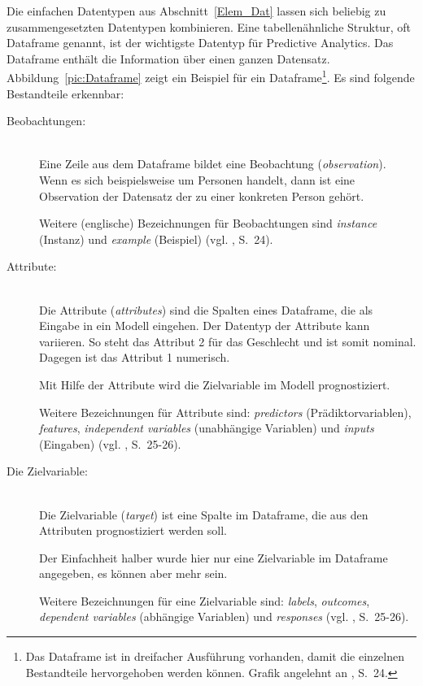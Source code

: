Die einfachen Datentypen aus Abschnitt~\ref{Elem_Dat} lassen sich beliebig zu
zusammengesetzten Datentypen kombinieren. Eine tabellenähnliche Struktur, oft
Dataframe genannt, ist der wichtigste Datentyp für Predictive Analytics. Das
Dataframe enthält die Information über einen ganzen Datensatz. Abbildung~\ref{pic:Dataframe}
zeigt ein Beispiel für ein Dataframe\footnote{
Das Dataframe ist in dreifacher Ausführung vorhanden, damit die einzelnen Bestandteile hervorgehoben werden können.
Grafik angelehnt an \cite{Bowles}, S.~24.
}. Es sind folgende Bestandteile erkennbar:

\begin{description}

\item[Beobachtungen:] \hfill \\
Eine Zeile aus dem Dataframe bildet eine Beobachtung (\emph{observation}).
Wenn es sich beispielsweise um Personen handelt, dann ist eine Observation der Datensatz der zu
einer konkreten Person gehört.

Weitere (englische) Bezeichnungen für Beobachtungen sind \emph{instance} (Instanz) und \emph{example} (Beispiel) (vgl. \cite{Bowles}, S.~24).

\item[Attribute:] \hfill \\
Die Attribute (\emph{attributes}) sind die Spalten eines Dataframe, die als Eingabe in ein Modell eingehen.
Der Datentyp der Attribute kann variieren. So steht das Attribut 2 für das Geschlecht und ist somit nominal.
Dagegen ist das Attribut 1 numerisch. 

Mit Hilfe der Attribute wird die Zielvariable im Modell prognostiziert.

Weitere Bezeichnungen für Attribute sind:
\emph{predictors} (Prädiktorvariablen), \emph{features}, \emph{independent variables} (unabhängige Variablen) und
\emph{inputs} (Eingaben)
(vgl. \cite{Bowles}, S.~25-26).

\item[Die Zielvariable:] \hfill \\
Die Zielvariable (\emph{target}) ist eine Spalte im Dataframe, die aus den Attributen prognostiziert werden soll.

Der Einfachheit halber wurde hier nur eine Zielvariable im Dataframe angegeben, es können aber mehr sein.

Weitere Bezeichnungen für eine Zielvariable sind: \emph{labels}, \emph{outcomes},
\emph{dependent variables} (abhängige Variablen) und \emph{responses}
(vgl. \cite{Bowles}, S.~25-26).

\end{description}

